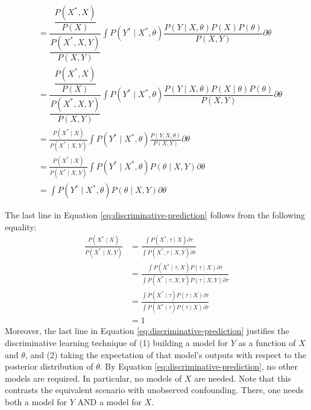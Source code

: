 \documentclass{article}
\begin{document}
\begin{equation}
\begin{aligned}
&= \dfrac{\dfrac{P \left( X^{*}, X \right)}{P \left( X \right)}}{\dfrac{P \left( X^{*}, X, Y \right)}{P \left( X, Y \right)}} \int P \left( Y^{*} \mid X^{*}, \theta \right) \dfrac{P \left( Y \mid X, \theta \right) P \left( X \right) P\left( \theta \right)}{P \left( X, Y \right)} \partial \theta\\
&= \dfrac{\dfrac{P \left( X^{*}, X \right)}{P \left( X \right)}}{\dfrac{P \left( X^{*}, X, Y \right)}{P \left( X, Y \right)}} \int P \left( Y^{*} \mid X^{*}, \theta \right) \dfrac{P \left( Y \mid X, \theta \right) P \left( X \mid \theta \right) P\left( \theta \right)}{P \left( X, Y \right)} \partial \theta\\
&= \frac{P \left( X^{*} \mid X \right)}{P \left( X^{*} \mid X, Y \right)} \int P \left( Y^{*} \mid X^{*}, \theta \right) \frac{P \left( Y, X, \theta \right)}{P \left( X, Y \right)} \partial \theta\\
&= \frac{P \left( X^{*} \mid X \right)}{P \left( X^{*} \mid X, Y \right)} \int P \left( Y^{*} \mid X^{*}, \theta \right) P \left( \theta \mid X, Y \right) \partial \theta\\
&=\int P \left( Y^{*} \mid X^{*}, \theta \right) P \left( \theta \mid X, Y \right) \partial \theta
\end{aligned}
\end{equation}

The last line in Equation \ref{eq:discriminative-prediction} follows from the following equality:
\begin{equation}
\begin{aligned}
\frac{P \left( X^{*} \mid X \right)}{P \left( X^{*} \mid X, Y \right)} &= \frac{\int P \left( X^{*}, \tau \mid X \right) \partial \tau}{\int P \left( X^{*}, \tau \mid X, Y \right) \partial \tau}\\
&= \frac{\int P \left( X^{*} \mid \tau, X \right) P \left( \tau \mid X \right) \partial \tau}{ \int P \left( X^{*} \mid \tau, X, Y \right) P \left( \tau \mid X, Y \right) \partial \tau}\\
&= \frac{\int P \left( X^{*} \mid \tau \right) P \left( \tau \mid X \right) \partial \tau}{\int P \left( X^{*} \mid \tau \right) P \left( \tau \mid X\right) \partial \tau}\\
&= 1
\end{aligned}
\end{equation}
Moreover, the last line in Equation \ref{eq:discriminative-prediction} justifies the discriminative learning technique of (1) building a model for $Y$ as a function of $X$ and $\theta$, and (2) taking the expectation of that model's outputs with respect to the posterior distribution of $\theta$. By Equation \ref{eq:discriminative-prediction}, no other models are required. In particular, no models of $X$ are needed. Note that this contrasts the equivalent scenario with unobserved confounding. There, one needs both a model for $Y$ AND a model for $X$.
\end{document}
